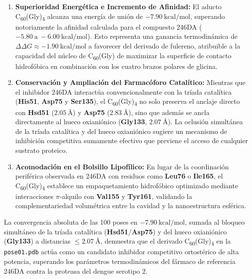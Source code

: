 \begin{enumerate}
    \item \textbf{Superioridad Energética e Incremento de Afinidad:} El aducto C\textsubscript{60}(Gly)\textsubscript{4} alcanza una energía de unión de $-7.90\ \text{kcal/mol}$, superando notoriamente la afinidad calculada para el compuesto 246DA ($-5.80\ \text{a}\ -6.00\ \text{kcal/mol}$). Esto representa una ganancia termodinámica de $\Delta\Delta G \approx -1.90\ \text{kcal/mol}$ a favorecer del derivado de fulereno, atribuible a la capacidad del núcleo de C\textsubscript{60}(Gly) de maximizar la superficie de contacto hidrofóbica en combinación con los cuatro brazos polares de glicina.
    
    \item \textbf{Conservación y Ampliación del Farmacóforo Catalítico:} Mientras que el inhibidor 246DA interactúa convencionalmente con la tríada catalítica (\textbf{His51}, \textbf{Asp75} y \textbf{Ser135}), el C\textsubscript{60}(Gly)\textsubscript{4} no solo preserva el anclaje directo con \textbf{Hsd51} ($2.05\ \text{\AA}$) y \textbf{Asp75} ($2.83\ \text{\AA}$), sino que además se ancla directamente al hueco oxianiónico (\textbf{Gly133}, $2.07\ \text{\AA}$). La oclusión simultánea de la tríada catalítica y del hueco oxianiónico sugiere un mecanismo de inhibición competitiva sumamente efectivo que previene el acceso de cualquier sustrato proteico.
    
    \item \textbf{Acomodación en el Bolsillo Lipofílico:} En lugar de la coordinación periférica observada en 246DA con residuos como \textbf{Leu76} o \textbf{Ile165}, el C\textsubscript{60}(Gly)\textsubscript{4} establece un empaquetamiento hidrofóbico optimizado mediante interacciones $\pi$-alquilo con \textbf{Val155} y \textbf{Tyr161}, validando la complementariedad volumétrica entre la cavidad y la nanoestructura esférica.
\end{enumerate}

La convergencia absoluta de las 100 poses en $-7.90\ \text{kcal/mol}$, sumada al bloqueo simultáneo de la tríada catalítica (\textbf{Hsd51}/\textbf{Asp75}) y del hueco oxianiónico (\textbf{Gly133}) a distancias $\le 2.07\ \text{\AA}$, demuestra que el derivado C\textsubscript{60}(Gly)\textsubscript{4} en la \texttt{pose01.pdb} actúa como un candidato inhibidor competitivo ortostérico de alta potencia, superando los parámetros termodinámicos del fármaco de referencia 246DA contra la proteasa del dengue serotipo 2.















